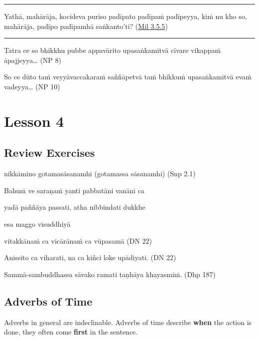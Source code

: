 \documentclass[11pt,oneside]{memoir}
\begin{document}
\noindent\rule{\textwidth}{0.5pt}

Yathā, mahārāja, kocideva puriso padīpato padīpaṁ padīpeyya, kiṁ nu kho so,
mahārāja, padīpo padīpamhā saṅkanto'ti? (\href{https://suttacentral.net/mil3.5.5/pli/ms}{Mil 3.5.5})

\noindent\rule{\textwidth}{0.5pt}

Tatra ce so bhikkhu pubbe appavārito upasaṅkamitvā cīvare vikappaṁ āpajjeyya\ldots{} (NP 8)

So ce dūto taṁ veyyāvaccakaraṁ saññāpetvā taṁ bhikkuṁ upasaṅkamitvā evaṁ vadeyya\ldots{} (NP 10)


\chapter{Lesson 4}
\label{sec:org34ffe18}
\section{Review Exercises}
\label{sec:orgbc06212}

nikkāmino gotamasāsanamhi (gotamassa sāsanamhi) (Snp 2.1)

Bahuṁ ve saraṇaṁ yanti pabbatāni vanāni ca

yadā paññāya passati, atha nibbindati dukkhe

esa maggo visuddhiyā

vitakkānaṁ ca vicārānaṁ ca vūpasamā (DN 22)

Anissito ca viharati, na ca kiñci loke upādiyati. (DN 22)

Sammā-sambuddhassa sāvako ramati taṇhāya khayasmiṁ. (Dhp 187)

\section{Adverbs of Time}
\label{sec:orgfb1fec1}

Adverbs in general are indeclinable. Adverbs of time describe \textbf{when} the action
is done, they often come \textbf{first} in the sentence.
\end{document}
